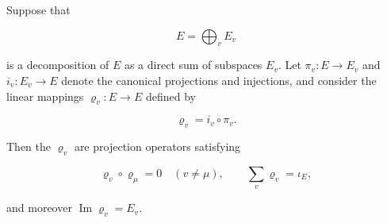 Suppose that

$$
E = \bigoplus_v E_v
$$

is a decomposition of $E$ as a direct sum of subspaces $E_v$. Let $\pi_v: E \to E_v$ and $i_v: E_v \to E$ denote the canonical projections and injections, and consider the linear mappings $\varrho_v: E \to E$ defined by

$$
\varrho_v = i_v \circ \pi_v.
$$

Then the $\varrho_v$ are projection operators satisfying

$$
\varrho_v \circ \varrho_\mu = 0 \quad (v \neq \mu), \qquad \sum_v \varrho_v = \iota_E,
$$

and moreover $\operatorname{Im} \varrho_v = E_v$.
